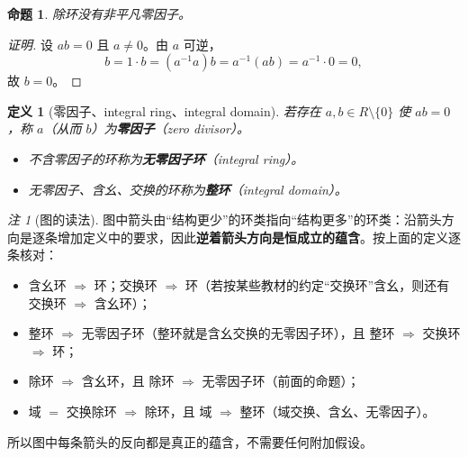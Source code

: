 \documentclass[11pt,a4paper]{ctexart}
\newtheorem*{definition}{定义}
\newtheorem*{proposition}{命题}
\theoremstyle{remark}
\newtheorem*{remark}{注}
\begin{document}
\begin{proposition}
除环没有非平凡零因子。
\end{proposition}

\begin{proof}[证明]
设 $ab=0$ 且 $a\neq 0$。由 $a$ 可逆，
\[
b=1\cdot b=(a^{-1}a)b=a^{-1}(ab)=a^{-1}\cdot 0=0,
\]
故 $b=0$。
\end{proof}

\begin{definition}[零因子、integral ring、integral domain]
若存在 $a,b\in R\setminus\{0\}$ 使 $ab=0$，称 $a$（从而 $b$）为\textbf{零因子}（zero divisor）。
\begin{itemize}
    \item 不含零因子的环称为\textbf{无零因子环}（integral ring）。
    \item 无零因子、含幺、交换的环称为\textbf{整环}（integral domain）。
\end{itemize}
\end{definition}

\begin{center}
\end{center}

\begin{remark}[图的读法]
图中箭头由“结构更少”的环类指向“结构更多”的环类：沿箭头方向是逐条增加定义中的要求，因此\textbf{逆着箭头方向是恒成立的蕴含}。按上面的定义逐条核对：
\begin{itemize}
    \item 含幺环 $\Rightarrow$ 环；交换环 $\Rightarrow$ 环（若按某些教材的约定“交换环”含幺，则还有 交换环 $\Rightarrow$ 含幺环）；
    \item 整环 $\Rightarrow$ 无零因子环（整环就是含幺交换的无零因子环），且 整环 $\Rightarrow$ 交换环 $\Rightarrow$ 环；
    \item 除环 $\Rightarrow$ 含幺环，且 除环 $\Rightarrow$ 无零因子环（前面的命题）；
    \item 域 $=$ 交换除环 $\Rightarrow$ 除环，且 域 $\Rightarrow$ 整环（域交换、含幺、无零因子）。
\end{itemize}
所以图中每条箭头的反向都是真正的蕴含，不需要任何附加假设。
\end{remark}
\end{document}

